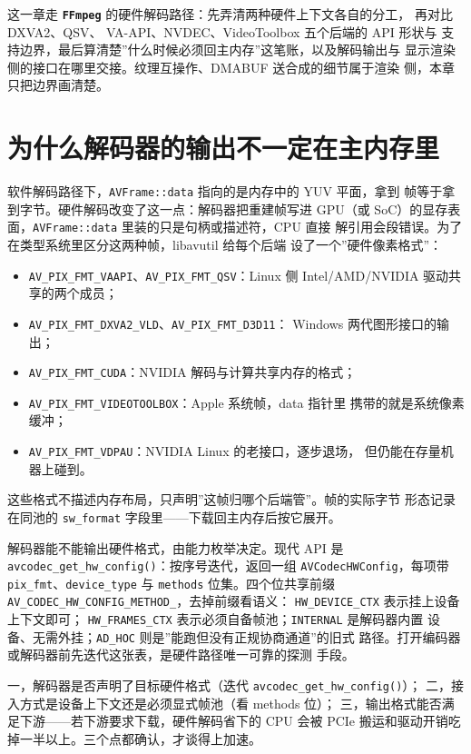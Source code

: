 \documentclass[12pt,a4paper,fontset=fandol]{ctexbook}
\newcommand{\Fn}[1]{\texttt{#1()}}
\newcommand{\Tp}[1]{\texttt{#1}}
\newcommand{\Bk}{\discretionary{}{}{}}
\newcommand{\Lib}[1]{\textbf{\texttt{#1}}}
\begin{document}
这一章走 \Lib{FFmpeg} 的硬件解码路径：先弄清两种硬件上下文各自的分工，
再对比 DXVA2、QSV、 VA-API、NVDEC、VideoToolbox 五个后端的 API 形状与
支持边界，最后算清楚''什么时候必须回主内存''这笔账，以及解码输出与
显示渲染侧的接口在哪里交接。纹理互操作、DMABUF 送合成的细节属于渲染
侧，本章只把边界画清楚。

\section{为什么解码器的输出不一定在主内存里}

软件解码路径下，\Tp{AVFrame::data} 指向的是内存中的 YUV 平面，拿到
帧等于拿到字节。硬件解码改变了这一点：解码器把重建帧写进 GPU（或
SoC）的显存表面，\Tp{AVFrame::data} 里装的只是句柄或描述符，CPU 直接
解引用会段错误。为了在类型系统里区分这两种帧，libavutil 给每个后端
设了一个''硬件像素格式''：

\begin{itemize}
  \item \Tp{AV\_PIX\_FMT\_VAAPI}、\Tp{AV\_PIX\_FMT\_QSV}：Linux 侧
        Intel/AMD/NVIDIA 驱动共享的两个成员；
  \item \Tp{AV\_PIX\_FMT\_DXVA2\_VLD}、\Tp{AV\_PIX\_FMT\_D3D11}：
        Windows 两代图形接口的输出；
  \item \Tp{AV\_PIX\_FMT\_CUDA}：NVIDIA 解码与计算共享内存的格式；
  \item \Tp{AV\_PIX\_FMT\_VIDEOTOOLBOX}：Apple 系统帧，data 指针里
        携带的就是系统像素缓冲；
  \item \Tp{AV\_PIX\_FMT\_VDPAU}：NVIDIA Linux 的老接口，逐步退场，
        但仍能在存量机器上碰到。
\end{itemize}

这些格式不描述内存布局，只声明''这帧归哪个后端管''。帧的实际字节
形态记录在同池的 \Tp{sw\_format} 字段里——下载回主内存后按它展开。

解码器能不能输出硬件格式，由能力枚举决定。现代 API 是
\Fn{avcodec\_{\Bk}get\Bk\_{\Bk}hw\_{\Bk}config}：按序号迭代，返回一组
\Tp{AVCodecHWConfig}，每项带 \Tp{pix\_fmt}、\Tp{device\_{\Bk}type} 与
\Tp{methods} 位集。四个位共享前缀
\Tp{AV\_{\Bk}CODEC\_{\Bk}HW\_{\Bk}CONFIG\_{\Bk}METHOD\_{\Bk}}，去掉前缀看语义：
\Tp{HW\_{\Bk}DEVICE\_{\Bk}CTX} 表示挂上设备上下文即可；
\Tp{HW\_{\Bk}FRAMES\_{\Bk}CTX} 表示必须自备帧池；\Tp{INTERNAL} 是解码器内置
设备、无需外挂；\Tp{AD\_HOC} 则是''能跑但没有正规协商通道''的旧式
路径。打开编码器或解码器前先迭代这张表，是硬件路径唯一可靠的探测
手段。

\begin{guideline}[title={硬件解码路径的三个判断点}]
  一，解码器是否声明了目标硬件格式（迭代 \Fn{avcodec\_get\Bk\_hw\_config}）；
  二，接入方式是设备上下文还是必须显式帧池（看 methods 位）；
  三，输出格式能否满足下游——若下游要求下载，硬件解码省下的 CPU
  会被 PCIe 搬运和驱动开销吃掉一半以上。三个点都确认，才谈得上加速。
\end{guideline}
\end{document}
